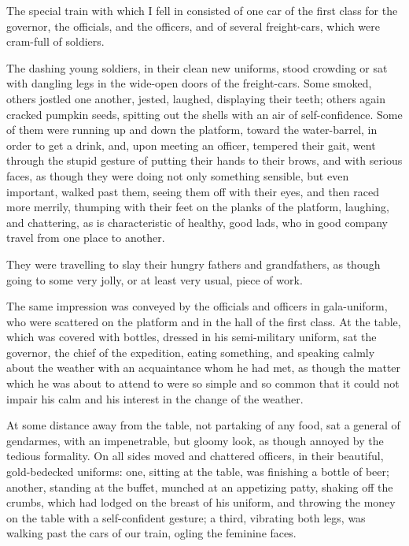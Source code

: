 \documentclass{book}
\begin{document}
The special train with which I fell in consisted of one car of the first class for the governor, the officials, and the officers, and of several freight-cars, which were cram-full of soldiers.

The dashing young soldiers, in their clean new uniforms, stood crowding or sat with dangling legs in the wide-open doors of the freight-cars. Some smoked, others jostled one another, jested, laughed, displaying their teeth; others again cracked pumpkin seeds, spitting out the shells with an air of self-confidence. Some of them were running up and down the platform, toward the water-barrel, in order to get a drink, and, upon meeting an officer, tempered their gait, went through the stupid gesture of putting their hands to their brows, and with serious faces, as though they were doing not only something sensible, but even important, walked past them, seeing them off with their eyes, and then raced more merrily, thumping with their feet on the planks of the platform, laughing, and chattering, as is characteristic of healthy, good lads, who in good company travel from one place to another.

They were travelling to slay their hungry fathers and grandfathers, as though going to some very jolly, or at least very usual, piece of work.

The same impression was conveyed by the officials and officers in gala-uniform, who were scattered on the platform and in the hall of the first class. At the table, which was covered with bottles, dressed in his semi-military uniform, sat the governor, the chief of the expedition, eating something, and speaking calmly about the weather with an acquaintance whom he had met, as though the matter which he was about to attend to were so simple and so common that it could not impair his calm and his interest in the change of the weather.

At some distance away from the table, not partaking of any food, sat a general of gendarmes, with an impenetrable, but gloomy look, as though annoyed by the tedious formality. On all sides moved and chattered officers, in their beautiful, gold-bedecked uniforms: one, sitting at the table, was finishing a bottle of beer; another, standing at the buffet, munched at an appetizing patty, shaking off the crumbs, which had lodged on the breast of his uniform, and throwing the money on the table with a self-confident gesture; a third, vibrating both legs, was walking past the cars of our train, ogling the feminine faces.
\end{document}
